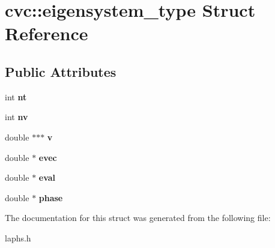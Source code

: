 \hypertarget{structcvc_1_1eigensystem__type}{\section{cvc\-:\-:eigensystem\-\_\-type Struct Reference}
\label{structcvc_1_1eigensystem__type}
}
\subsection*{Public Attributes}
\begin{DoxyCompactItemize}
\item 
\hypertarget{structcvc_1_1eigensystem__type_a7e78e535c645439e927a68a60ce42657}{int {\bfseries nt}}\label{structcvc_1_1eigensystem__type_a7e78e535c645439e927a68a60ce42657}

\item 
\hypertarget{structcvc_1_1eigensystem__type_a89ab1fa3af90a92c7b72a619aacd9b80}{int {\bfseries nv}}\label{structcvc_1_1eigensystem__type_a89ab1fa3af90a92c7b72a619aacd9b80}

\item 
\hypertarget{structcvc_1_1eigensystem__type_aa6e96af3a4f2fa6312927b775466b35d}{double $\ast$$\ast$$\ast$ {\bfseries v}}\label{structcvc_1_1eigensystem__type_aa6e96af3a4f2fa6312927b775466b35d}

\item 
\hypertarget{structcvc_1_1eigensystem__type_a7433dd4b840e58ae6246563c54c9df0e}{double $\ast$ {\bfseries evec}}\label{structcvc_1_1eigensystem__type_a7433dd4b840e58ae6246563c54c9df0e}

\item 
\hypertarget{structcvc_1_1eigensystem__type_a60a140142b4133b76be484d7a7abc2cf}{double $\ast$ {\bfseries eval}}\label{structcvc_1_1eigensystem__type_a60a140142b4133b76be484d7a7abc2cf}

\item 
\hypertarget{structcvc_1_1eigensystem__type_a002ac1e5eaf95b09ba64dbc57ef2b793}{double $\ast$ {\bfseries phase}}\label{structcvc_1_1eigensystem__type_a002ac1e5eaf95b09ba64dbc57ef2b793}

\end{DoxyCompactItemize}


The documentation for this struct was generated from the following file\-:\begin{DoxyCompactItemize}
\item 
laphs.\-h\end{DoxyCompactItemize}
